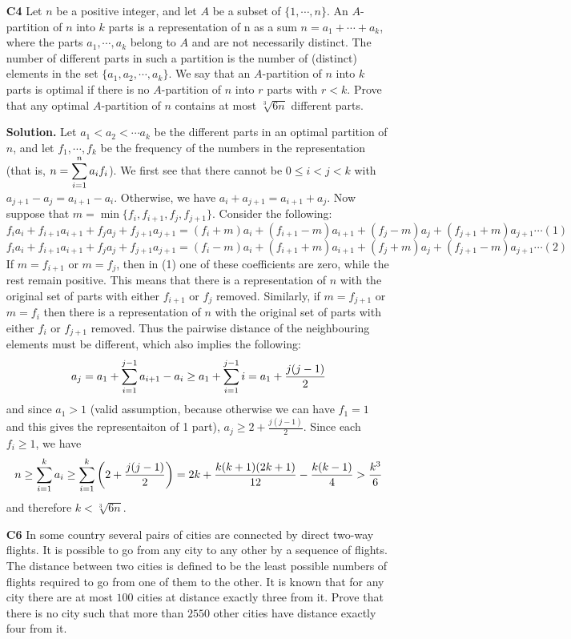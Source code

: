 \documentclass[11pt,a4paper]{article}
\begin{document}
\begin{enumerate}
	\item [\textbf{C4}] Let $n$ be a positive integer, and let $A$ be a subset of $\{ 1,\cdots ,n\}$. An $A$-partition of $n$ into $k$ parts is a representation of n as a sum $n = a_1 + \cdots + a_k$, where the parts $a_1 , \cdots , a_k $ belong to $A$ and are not necessarily distinct. The number of different parts in such a partition is the number of (distinct) elements in the set $\{ a_1 , a_2 , \cdots , a_k \} $.
	We say that an $A$-partition of $n$ into $k$ parts is optimal if there is no $A$-partition of $n$ into $r$ parts with $r<k$. Prove that any optimal $A$-partition of $n$ contains at most $\sqrt[3]{6n}$ different parts.
	
	\textbf{Solution.} Let $a_1<a_2<\cdots a_k$ be the different parts in an optimal partition of $n$, and let $f_1, \cdots , f_k$ be the frequency of the numbers in the representation 
	(that is, $n=\displaystyle\sum_{i=1}^n a_if_i$). 
	We first see that there cannot be $0\le i< j < k$ with $a_{j+1}-a_j=a_{i+1}-a_i$. 
	Otherwise, we have $a_i+a_{j+1}=a_{i+1}+a_j$. 
	Now suppose that $m = \min\{f_i, f_{i+1}, f_j, f_{j+1}\}$. Consider the following:
	\[f_ia_i+f_{i+1}a_{i+1}+f_ja_j+f_{j+1}a_{j+1}
	=(f_i+m)a_i+(f_{i+1}-m)a_{i+1}+(f_j-m)a_j+(f_{j+1}+m)a_{j+1}\cdots (1)
	\]
	\[f_ia_i+f_{i+1}a_{i+1}+f_ja_j+f_{j+1}a_{j+1}
	=(f_i-m)a_i+(f_{i+1}+m)a_{i+1}+(f_j+m)a_j+(f_{j+1}-m)a_{j+1}\cdots (2)
	\]
	If $m=f_{i+1}$ or $m=f_j$, then in (1) one of these coefficients are zero, while the rest remain positive. This means that there is a representation of $n$ with the original set of parts with either $f_{i+1}$ or $f_j$ removed. 
	Similarly, if $m=f_{j+1}$ or $m=f_i$ then there is a representation of $n$ with the original set of parts with either $f_i$ or $f_{j+1}$ removed. 
	Thus the pairwise distance of the neighbouring elements must be different, which also implies the following: 
	\[a_j=a_1+\displaystyle\sum_{i=1}^{j-1}a_{i+1}-a_i\ge a_1+\displaystyle\sum_{i=1}^{j-1}i=a_1+\frac{j(j-1)}{2}
	\]
	and since $a_1>1$ (valid assumption, because otherwise we can have $f_1=1$ and this gives the representaiton of 1 part), $a_j\ge 2+\frac{j(j-1)}{2}$. Since each $f_i\ge 1$, we have 
	\[
	n\ge \displaystyle\sum_{i=1}^k a_i
	\ge \displaystyle\sum_{i=1}^k \left(2 + \frac{j(j-1)}{2}\right)
	=2k+\frac{k(k+1)(2k+1)}{12}-\frac{k(k-1)}{4}
	>\frac{k^3}{6}
	\]
	and therefore $k<\sqrt[3]{6n}$. 
	
	\item[\textbf{C6}] In some country several pairs of cities are connected by direct two-way flights. It is possible to go from any city to any other by a sequence of flights. The distance between two cities is defined to be the least possible numbers of flights required to go from one of them to the other. It is known that for any city there are at most $100$ cities at distance exactly three from it. Prove that there is no city such that more than $2550$ other cities have distance exactly four from it.
	

\end{enumerate}
\end{document}
